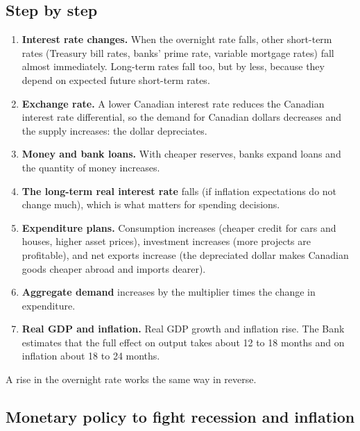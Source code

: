 \subsection{Step by step}

\begin{enumerate}
  \item \textbf{Interest rate changes.} When the overnight rate falls, other short-term
        rates (Treasury bill rates, banks' prime rate, variable mortgage rates) fall
        almost immediately. Long-term rates fall too, but by less, because they depend on
        expected future short-term rates.
  \item \textbf{Exchange rate.} A lower Canadian interest rate reduces the Canadian
        interest rate differential, so the demand for Canadian dollars decreases and the
        supply increases: the dollar depreciates.
  \item \textbf{Money and bank loans.} With cheaper reserves, banks expand loans and the
        quantity of money increases.
  \item \textbf{The long-term real interest rate} falls (if inflation expectations do not
        change much), which is what matters for spending decisions.
  \item \textbf{Expenditure plans.} Consumption increases (cheaper credit for cars and
        houses, higher asset prices), investment increases (more projects are profitable),
        and net exports increase (the depreciated dollar makes Canadian goods cheaper
        abroad and imports dearer).
  \item \textbf{Aggregate demand} increases by the multiplier times the change in
        expenditure.
  \item \textbf{Real GDP and inflation.} Real GDP growth and inflation rise. The Bank
        estimates that the full effect on output takes about 12 to 18 months and on
        inflation about 18 to 24 months.
\end{enumerate}
A rise in the overnight rate works the same way in reverse.

\subsection{Monetary policy to fight recession and inflation}

\begin{center}
\end{center}

